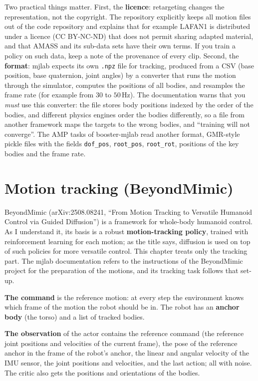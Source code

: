 Two practical things matter. First, the \textbf{licence}: retargeting changes the representation, not the copyright. The repository explicitly keeps all motion files out of the code repository and explains that for example LAFAN1 is distributed under a licence (CC BY-NC-ND) that does not permit sharing adapted material, and that AMASS and its sub-data sets have their own terms. If you train a policy on such data, keep a note of the provenance of every clip. Second, the \textbf{format}: mjlab expects its own \texttt{.npz} file for tracking, produced from a CSV (base position, base quaternion, joint angles) by a converter that runs the motion through the simulator, computes the positions of all bodies, and resamples the frame rate (for example from $30$ to $50$\,Hz). The documentation warns that you \emph{must} use this converter: the file stores body positions indexed by the order of the bodies, and different physics engines order the bodies differently, so a file from another framework maps the targets to the wrong bodies, and ``training will not converge''. The AMP tasks of booster-mjlab read another format, GMR-style pickle files with the fields \texttt{dof\_pos}, \texttt{root\_pos}, \texttt{root\_rot}, positions of the key bodies and the frame rate.

\section*{Motion tracking (BeyondMimic)}
BeyondMimic (arXiv:2508.08241, ``From Motion Tracking to Versatile Humanoid Control via Guided Diffusion'') is a framework for whole-body humanoid control. As I understand it, its basis is a robust \textbf{motion-tracking policy}, trained with reinforcement learning for each motion; as the title says, diffusion is used on top of such policies for more versatile control. This chapter treats only the tracking part. The mjlab documentation refers to the instructions of the BeyondMimic project for the preparation of the motions, and its tracking task follows that set-up.

\textbf{The command} is the reference motion: at every step the environment knows which frame of the motion the robot should be in. The robot has an \textbf{anchor body} (the torso) and a list of tracked bodies.

\textbf{The observation} of the actor contains the reference command (the reference joint positions and velocities of the current frame), the pose of the reference anchor in the frame of the robot's anchor, the linear and angular velocity of the IMU sensor, the joint positions and velocities, and the last action; all with noise. The critic also gets the positions and orientations of the bodies.

